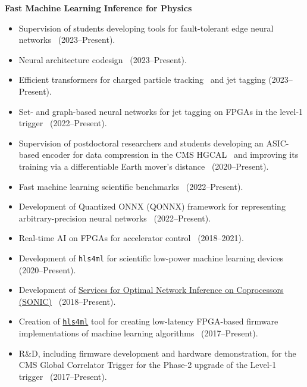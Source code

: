 \documentclass[11pt]{res}
\begin{document}
\begin{resume}
  \textbf{Fast Machine Learning Inference for Physics}
  \begin{itemize}
    \itemsep-0.3em
    \item Supervision of students developing tools for fault-tolerant edge neural networks~\cite{Baldi:2024reliable,Weng:2024fkeras} (2023--Present).
    \item Neural architecture codesign~\cite{McDermott:2023neural} (2023--Present).
    \item Efficient transformers for charged particle tracking~\cite{Miao:2024oqy} and jet tagging (2023--Present).
    \item Set- and graph-based neural networks for jet tagging on FPGAs in the level-1 trigger~\cite{Odagiu:2024bkp} (2022--Present).
    \item Supervision of postdoctoral researchers and students developing an ASIC-based encoder for data compression in the CMS HGCAL~\cite{DiGuglielmo:2021ide} and improving its training via a differentiable Earth mover's distance~\cite{Shenoy:2023ros} ({2020--Present}).
    \item Fast machine learning scientific benchmarks~\cite{Duarte:2022hdp} (2022--Present).
    \item Development of Quantized ONNX (QONNX) framework for representing arbitrary-precision neural networks~\cite{Pappalardo:2022nxk} (2022--Present).
    \item Real-time AI on FPGAs for accelerator control~\cite{John:2020sak} ({2018--2021}).
    \item Development of \texttt{hls4ml} for scientific low-power machine learning devices~\cite{Campos:2023pkp,Weng:2023tailor,Hussain:2022faststamp,Borras:2022opensource,Banbury:2021mlperf,DiGuglielmo:2021ide,Hawks:2021ruw,Fahim:2021cic} ({2020--Present}).
    \item Development of \href{https://github.com/fastmachinelearning/SonicCMS}{Services for Optimal Network Inference on Coprocessors (SONIC)}~\cite{CMS:2024twn,CMS-DP-2023-037,Krupa:2020bwg,Rankin:2020usv,neurips2019_sonic,Duarte:2019fta} ({2018--Present}).
    \item Creation of \href{https://fastmachinelearning.org/hls4ml/}{\texttt{hls4ml}} tool for creating low-latency FPGA-based firmware implementations of machine learning algorithms~\cite{Deiana:2021niw,Elabd:2021lgo,Govorkova:2021utb,Iiyama:2020wap,Heintz:2020soy,DiGuglielmo:2020eqx,Summers:2020xiy,neurips2019_hls4ml,Duarte:2018ite} ({2017--Present}).
    \item R\&D, including firmware development and hardware demonstration, for the CMS Global Correlator Trigger for the Phase-2 upgrade of the Level-1 trigger~\cite{CERN-LHCC-2020-004} (2017--Present).
  \end{itemize}


\end{resume}
\end{document}
